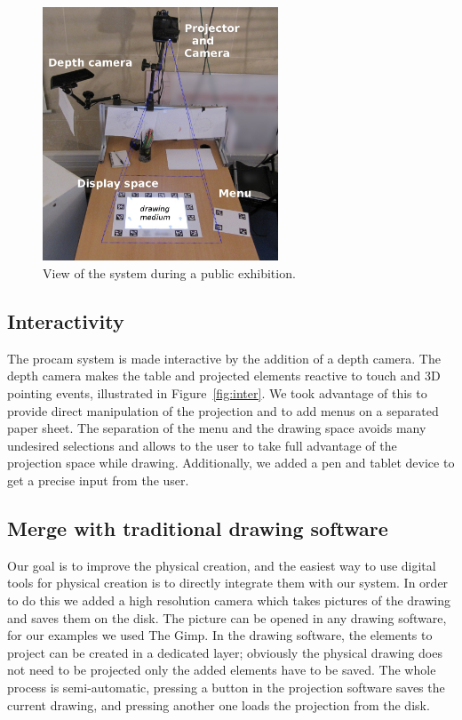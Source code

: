 \documentclass{article}
\begin{document}
\begin{figure}[!b]
\centering \includegraphics[width = 70mm]{global}
\caption{View of the system during a public exhibition.} 
\label{fig:system}
\end{figure}

\subsection{Interactivity}

The procam system is made interactive by the addition of a depth camera. The depth camera makes the table and projected elements reactive to touch and 3D pointing events, illustrated in Figure~\ref{fig:inter}. We took advantage of this to provide direct manipulation of the projection and to add menus on a separated paper sheet. The separation of the menu and the drawing space avoids many undesired selections and allows to the user to take full advantage of the projection space while drawing. Additionally, we added a pen and tablet device to get a precise input from the user. 

\subsection{Merge with traditional drawing software}
Our goal is to improve the physical creation, and the easiest way to use digital tools for physical creation is to directly integrate them with our system. In order to do this we added a high resolution camera which takes pictures of the drawing and saves them on the disk. The picture can be opened in any drawing software, for our examples we used The Gimp. In the drawing software, the elements to project can be created in a dedicated layer; obviously the physical drawing does not need to be projected only the added elements have to be saved. The whole process is semi-automatic, pressing a button in the projection software saves the current drawing, and pressing another one loads the projection from the disk. 
\end{document}
